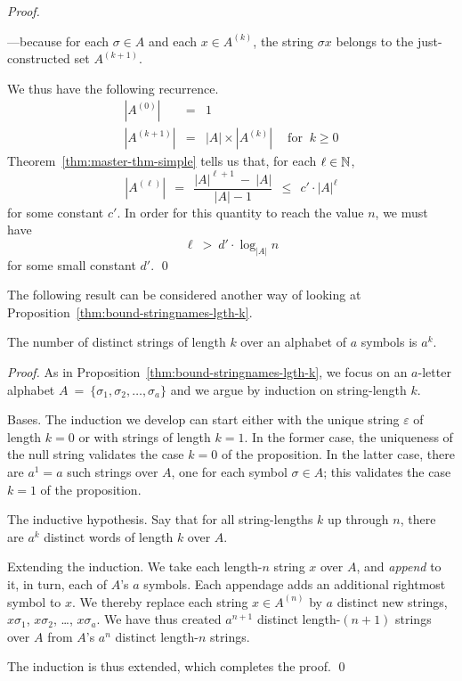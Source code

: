 \begin{proof}
\begin{itemize}
\begin{itemize}
---because for each $\sigma \in A$ and each $x \in A^{(k)}$, the string $\sigma x$ belongs to the just-constructed set $A^{(k+1)}$.
  \end{itemize}
\end{itemize}
We thus have the following recurrence.
\begin{eqnarray*}
|A^{(0)}|     & = & 1 \\
|A^{(k+1)}| & = & |A| \times |A^{(k)}| \ \ \ \  \mbox{ for } \ k \geq 0
\end{eqnarray*}
Theorem~\ref{thm:master-thm-simple} tells us that, for each $\ell \in \mathbb{N}$,
\[ |A^{(\ell)}| \ \ = \ \ \frac{|A|^{\ell+1} \ - \ |A|}{|A| -1} \ \ \leq \ \ c' \cdot |A|^{\ell}
\]
for some constant $c'$.  In order for this quantity to reach the value $n$, we must have
\[ \ell \ > \ d' \cdot \log_{|A|} n   \]
for some small constant $d'$.  \qed
\end{proof}

The following result can be considered another way of looking at Proposition~\ref{thm:bound-stringnames-lgth-k}.

\begin{prop}
\label{thm:Num-strings-lgth-k}
The number of distinct strings of length $k$ over an alphabet of $a$ symbols is $a^k$.
\end{prop}

\begin{proof}
As in Proposition~\ref{thm:bound-stringnames-lgth-k}, we focus on an $a$-letter alphabet $A \ = \ \{\sigma_1, \sigma_2, \ldots, \sigma_a\}$ and we argue by induction on string-length $k$.

\medskip

\noindent
{\sf Bases.}
The induction we develop can start either with the unique string $\varepsilon$ of length $k=0$ or with strings of length $k=1$.  In the former case, the uniqueness of the null string validates the case $k=0$ of the proposition.  In the latter case, there are $a^1 = a$ such strings over $A$, one for each symbol $\sigma \in A$; this validates the case $k=1$ of the proposition.

\medskip

\noindent
{\sf The inductive hypothesis.}
Say that for all string-lengths $k$ up through $n$, there are $a^k$ distinct words of length $k$ over $A$.

\medskip


\noindent
{\sf Extending the induction.}
We take each length-$n$ string $x$ over $A$, and {\em append} to it, in turn, each of $A$'s $a$
symbols.  Each appendage adds an additional rightmost symbol to $x$.  We thereby replace each string $x \in A^{(n)}$ by $a$ distinct new strings, $x \sigma_1$, $x \sigma_2$, \ldots, $x \sigma_a$.  We have thus created $a^{n+1}$ distinct length-$(n+1)$ strings over $A$ from $A$'s $a^n$ distinct length-$n$ strings.

\smallskip

The induction is thus extended, which completes the proof.  \qed
\end{proof}


